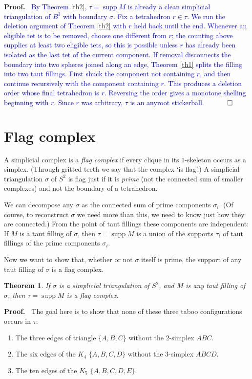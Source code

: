 \documentclass[12pt]{article}
\newtheorem{theorem}{Theorem}
\newcommand{\proofstart}{{\noindent \bf Proof.\ }}
\newcommand{\proofend}{$\quad \qed$}
\begin{document}
{\proofstart
\textcolor{blue}{By Theorem \ref{th2}, $\tau=\operatorname{supp}M$ is already a clean
simplicial triangulation of $B^3$ with boundary $\sigma$.  Fix a tetrahedron
$r\in\tau$.  We run the deletion argument of Theorem \ref{th2} with $r$
held back until the end.  Whenever an eligible tet is to be removed, choose
one different from $r$; the counting above supplies at least two eligible
tets, so this is possible unless $r$ has already been isolated as the last tet
of the current component.  If removal disconnects the boundary into two
spheres joined along an edge, Theorem \ref{th1} splits the filling into two
taut fillings.  First shuck the component not containing $r$, and then
continue recursively with the component containing $r$.  This produces a
deletion order whose final tetrahedron is $r$.  Reversing the order gives a
monotone shelling beginning with $r$.  Since $r$ was arbitrary, $\tau$ is an
anyroot stickerball.}
\proofend

}
\section{Flag complex}

A simplicial complex is a \emph{flag complex}
if every clique in
its $1$-skeleton occurs as a simplex.
(Through gritted teeth we say that the complex `is flag'.)
A simplicial triangulation $\sigma$ of $S^2$
is flag just if it is \emph{prime} 
(not the connected sum of smaller complexes)
and not the boundary of a tetrahedron.

We can decompose any $\sigma$ as the connected sum of
prime components $\sigma_i$.
(Of course, to reconstruct $\sigma$ we need more than this, we need to know
just how they are connected.)
From the point of taut fillings these components are independent:
If $M$ is a taut filling of $\sigma$, then $\tau=\operatorname{supp}M$ is a union of the supports $\tau_i$ of taut fillings of the prime components $\sigma_i$.

Now we want to show that, whether or not $\sigma$ itself is prime, 
the support of any taut filling of $\sigma$ is a flag complex.

\begin{theorem}
If $\sigma$ is a simplicial triangulation of $S^2$,
and $M$ is any taut filling of $\sigma$,
then $\tau=\operatorname{supp}M$ is a flag complex.
\end{theorem}

\proofstart
The goal here is to show that none of these
three taboo configurations occurs
in $\tau$:
\begin{enumerate}
\item
The three edges of triangle $\{A,B,C\}$ without the 2-simplex $ABC$.
\item
The six edges of the $K_4$ $\{A,B,C,D\}$ without the 3-simplex $ABCD$.
\item
The ten edges of the $K_5$ $\{A,B,C,D,E\}$.
\end{enumerate}
\end{document}
